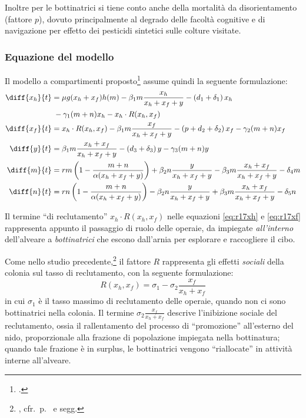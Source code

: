 \begin{enumerate}
    Inoltre per le bottinatrici si tiene conto anche della mortalità da disorientamento (fattore $p$), dovuto
    principalmente al degrado delle facoltà cognitive e di navigazione per effetto dei pesticidi
    sintetici sulle colture visitate.
\end{enumerate}


\subsubsection{Equazione del modello}
Il modello a compartimenti proposto\footcite[8]{ratti2017} assume quindi la seguente formulazione:
\begin{align}
    \diff{x_h}{t} &= \mu g( x_h + x_f ) h(m) - \beta_1 m \frac{x_h}{x_h + x_f + y} - \left( d_1 + \delta_1 \right) x_h \notag \\ %
    \label{eq:r17xh}
        &{\;} - \gamma_1 (m+n) x_h - x_h \cdot R(x_h, x_f) \\ %
    \label{eq:r17xf}
    \diff{x_f}{t} &= x_h \cdot R(x_h, x_f) - \beta_1 m \frac{x_f}{x_h + x_f + y}
    - \left( p + d_2 + \delta_2 \right) x_f - \gamma_2 (m+n) x_f \\
    \label{eq:r17y}
    \diff{y}{t} &= \beta_1 m \frac{x_h + x_f}{x_h + x_f + y} - \left( d_3 + \delta_3 \right) y - \gamma_3 (m+n) y \\
    \label{eq:r17m}
    \diff{m}{t} &= rm \left( 1 - \frac{m+n}{ \alpha (x_h + x_f + y) } \right) + \beta_2 n \frac{y}{x_h + x_f + y}
    - \beta_3 m \frac{x_h + x_f}{x_h + x_f + y} - \delta_4 m \\
    \label{eq:r17n}
    \diff{n}{t} &= rn \left( 1 - \frac{m+n}{ \alpha (x_h + x_f + y) } \right) - \beta_2 n \frac{y}{x_h + x_f + y}
    + \beta_3 m \frac{x_h + x_f}{x_h + x_f + y} - \delta_5 n
\end{align}

Il termine ``di reclutamento'' $x_h \cdot R(x_h, x_f)$ nelle equazioni \eqref{eq:r17xh} e \eqref{eq:r17xf} rappresenta appunto il passaggio di ruolo delle operaie, da impiegate \emph{all'interno} dell'alveare a \emph{bottinatrici} che escono dall'arnia per esplorare e raccogliere il cibo.

Come nello studio precedente,\footnote{\cite{khoury2011}, cfr.~p.~\pageref{eq:Recr} e segg.}
il fattore $R$ rappresenta gli effetti \emph{sociali}
della colonia sul tasso di reclutamento, con la seguente formulazione:
\begin{equation}
    R(x_h, x_f) = \sigma_1 - \sigma_2 \frac{x_f}{x_h + x_f}
    \label{eq:reclutam}
\end{equation}
in cui $\sigma_1$ è il tasso massimo di reclutamento delle operaie, quando non ci sono bottinatrici nella colonia.
Il termine $\sigma_2 \frac{x_f}{x_h + x_f}$ descrive l'inibizione sociale del reclutamento, ossia il rallentamento del processo di ``promozione'' all'esterno del nido, proporzionale alla frazione di popolazione impiegata nella bottinatura; quando tale frazione è in surplus, le bottinatrici vengono ``riallocate'' in attività interne all'alveare.

